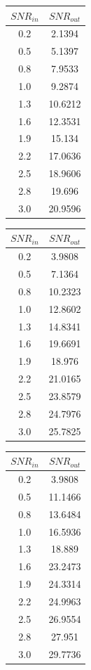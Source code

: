 \begin{tabular}{|c|c|}
\hline
$SNR_{in}$ & $SNR_{out}$\\ \hline
0.2 & 2.1394\\ \hline
0.5 & 5.1397\\ \hline
0.8 & 7.9533\\ \hline
1.0 & 9.2874\\ \hline
1.3 & 10.6212\\ \hline
1.6 & 12.3531\\ \hline
1.9 & 15.134\\ \hline
2.2 & 17.0636\\ \hline
2.5 & 18.9606\\ \hline
2.8 & 19.696\\ \hline
3.0 & 20.9596\\ \hline
\end{tabular}
\begin{tabular}{|c|c|}
\hline
$SNR_{in}$ & $SNR_{out}$\\ \hline
0.2 & 3.9808\\ \hline
0.5 & 7.1364\\ \hline
0.8 & 10.2323\\ \hline
1.0 & 12.8602\\ \hline
1.3 & 14.8341\\ \hline
1.6 & 19.6691\\ \hline
1.9 & 18.976\\ \hline
2.2 & 21.0165\\ \hline
2.5 & 23.8579\\ \hline
2.8 & 24.7976\\ \hline
3.0 & 25.7825\\ \hline
\end{tabular}
\begin{tabular}{|c|c|}
\hline
$SNR_{in}$ & $SNR_{out}$\\ \hline
0.2 & 3.9808\\ \hline
0.5 & 11.1466\\ \hline
0.8 & 13.6484\\ \hline
1.0 & 16.5936\\ \hline
1.3 & 18.889\\ \hline
1.6 & 23.2473\\ \hline
1.9 & 24.3314\\ \hline
2.2 & 24.9963\\ \hline
2.5 & 26.9554\\ \hline
2.8 & 27.951\\ \hline
3.0 & 29.7736\\ \hline
\end{tabular}

